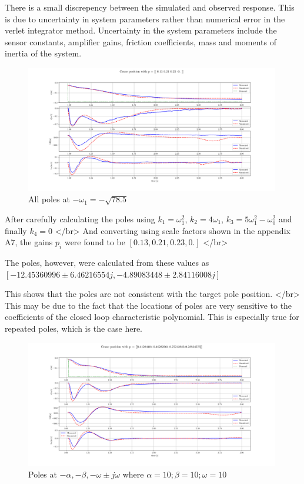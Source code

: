 \documentclass{article}
\begin{document}
There is a small discrepency between the simulated and observed response. This is due to uncertainty in system parameters rather than numerical error in the verlet integrator method.
Uncertainty in the system parameters include the sensor constants, amplifier gains, friction coefficients, mass and moments of inertia of the system.


\begin{figure}[H]
  \centering
  \includegraphics[width=0.99\textwidth]{figures/3.4a.png}
  \caption{All poles at $-\omega_1 = -\sqrt{78.5}$}
  \label{fig:exp3.4a}
\end{figure}

After carefully calculating the poles using $k_1 = \omega_1^2$, $k_2 = 4\omega_1$, $k_3 = 5\omega_1^2 - \omega_0^2$ and finally $k_4 = 0$ </br>
And converting using scale factors shown in the appendix A7, the gains $p_i$ were found to be $[ 0.13,  0.21,  0.23, 0.  ]$ </br>

The poles, however, were calculated from these values as $[-12.45360996 \pm 6.46216554j, -4.89083448 \pm 2.84116008j]$

This shows that the poles are not consistent with the target pole position. </br>
This may be due to the fact that the locations of poles are very sensitive to the coefficients of the closed loop characteristic polynomial.
This is especially true for repeated poles, which is the case here.

\begin{figure}[H]
  \centering
  \includegraphics[width=0.99\textwidth]{figures/3.4b.png}
  \caption{Poles at $-\alpha, -\beta, -\omega \pm j\omega$ where $\alpha = 10; \beta = 10; \omega = 10$}
  \label{fig:exp3.4b}
\end{figure}
\end{document}
